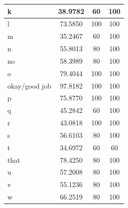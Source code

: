 \documentclass[journal]{./IEEE/IEEEtran}
\begin{document}
\begin{table}[ht!]
\begin{tabular}{|l|c|c|c|}
k                                      & 38.9782                   & 60                      & 100                     \\ \hline
l                                      & 73.5850                   & 100                     & 100                     \\ \hline
m                                      & 35.2467                   & 60                      & 100                     \\ \hline
n                                      & 55.8013                   & 80                      & 100                     \\ \hline
no                                     & 58.3989                   & 80                      & 100                     \\ \hline
o                                      & 79.4044                   & 100                     & 100                     \\ \hline
okay/good job                        & 97.8182                   & 100                     & 100                     \\ \hline
p                                      & 75.8770                   & 100                     & 100                     \\ \hline
q                                      & 45.2842                   & 60                      & 100                     \\ \hline
r                                      & 43.0818                   & 100                     & 100                     \\ \hline
s                                      & 56.6103                   & 80                      & 100                     \\ \hline
t                                      & 34.6972                   & 60                      & 60                      \\ \hline
that                                   & 78.4250                   & 80                      & 100                     \\ \hline
u                                      & 57.2008                   & 80                      & 100                     \\ \hline
v                                      & 55.1236                   & 80                      & 100                     \\ \hline
w                                      & 66.2519                   & 80                      & 100                     \\ \hline

\end{tabular}
\end{table}
\end{document}
